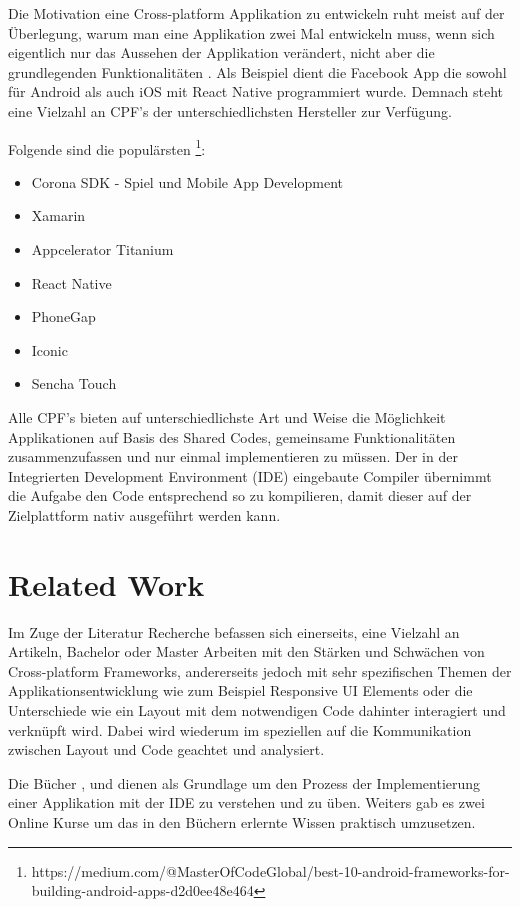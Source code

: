 	\newpage
	Die Motivation eine Cross-platform Applikation zu entwickeln ruht meist auf der Überlegung, warum man eine Applikation zwei Mal entwickeln muss, wenn sich eigentlich nur das Aussehen der Applikation verändert, nicht aber die grundlegenden Funktionalitäten \cite{Maximilian2017}. Als Beispiel dient die Facebook App die sowohl für Android als auch iOS mit React Native programmiert wurde. Demnach steht eine Vielzahl an CPF's der unterschiedlichsten Hersteller zur Verfügung.

	Folgende sind die populärsten \footnote{https://medium.com/@MasterOfCodeGlobal/best-10-android-frameworks-for-building-android-apps-d2d0ee48e464}:
	\begin{itemize}
		\setlength\itemsep{0em}
		\item Corona SDK - Spiel und Mobile App Development
		\item Xamarin
		\item Appcelerator Titanium
		\item React Native
		\item PhoneGap
		\item Iconic
		\item Sencha Touch
	\end{itemize}

	Alle CPF's bieten auf unterschiedlichste Art und Weise die Möglichkeit Applikationen auf Basis des \grqq Shared Codes\grqq, gemeinsame Funktionalitäten zusammenzufassen und nur einmal implementieren zu müssen. Der in der Integrierten Development Environment (IDE) eingebaute Compiler übernimmt die Aufgabe den Code entsprechend so zu kompilieren, damit dieser auf der Zielplattform nativ ausgeführt werden kann.

\newpage
\section{Related Work}
\label{sec:relatedwork}

Im Zuge der Literatur Recherche befassen sich einerseits, eine Vielzahl an Artikeln, Bachelor oder Master Arbeiten mit den Stärken und Schwächen von Cross-platform Frameworks, andererseits jedoch mit sehr spezifischen Themen der Applikationsentwicklung wie zum Beispiel Responsive UI Elements oder die Unterschiede wie ein Layout mit dem notwendigen Code dahinter interagiert und verknüpft wird. Dabei wird wiederum im speziellen auf die Kommunikation zwischen Layout und Code geachtet und analysiert.

Die Bücher \cite{book:Xamarin.Forms-Succinctly}, \cite{book:Xamarin.Forms-Essentials:} und \cite{book:Cross-platform-UI-Development-with-Xamarin.Forms} dienen als Grundlage um den Prozess der Implementierung einer Applikation mit der IDE zu verstehen und zu üben. Weiters gab es zwei Online Kurse um das in den Büchern erlernte Wissen praktisch umzusetzen.

